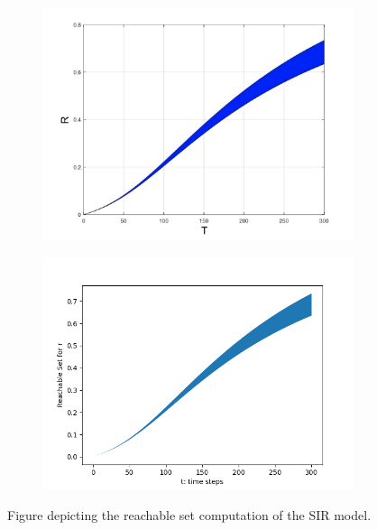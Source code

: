 \documentclass[EPiC]{easychair}
\begin{document}
\begin{figure}[h]
    \hspace{-15ex}  
    \begin{subfigure}{0.6\textwidth}
    \centering
    \includegraphics[width=\textwidth]{SapoFigures/SIR/SapoSIR_R.jpg}
    \end{subfigure}
    \begin{subfigure}{0.6\textwidth}
    \centering
    \includegraphics[width=1.2\textwidth]{SapoFigures/SIR/KaaSIR_R.png}
    \end{subfigure}
    
    \caption{Figure depicting the reachable set computation of the SIR model.} 
    \label{fig1}
\end{figure}
\end{document}

